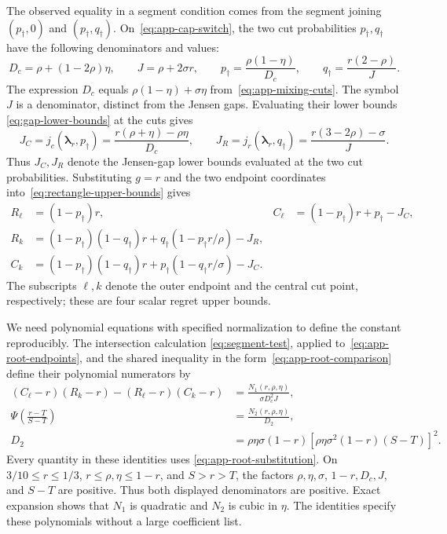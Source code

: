 \documentclass[11pt]{article}
\theoremstyle{remark}
\theoremstyle{plain}
\begin{document}
The observed equality in a segment condition comes from the segment joining
$(p_\dagger,0)$ and $(p_\dagger,q_\dagger)$. On~\eqref{eq:app-cap-switch},
the two cut probabilities $p_\dagger,q_\dagger$ have the following
denominators and values:
\begin{equation}
 D_c=\rho+(1-2\rho)\eta,\qquad J=\rho+2\sigma r,\qquad
 p_\dagger=\frac{\rho(1-\eta)}{D_c},\qquad
 q_\dagger=\frac{r(2-\rho)}{J}.
 \label{eq:app-root-cuts}
\end{equation}
The expression $D_c$ equals $\rho(1-\eta)+\sigma\eta$
from~\eqref{eq:app-mixing-cuts}. The symbol $J$ is a denominator,
distinct from the Jensen gaps. Evaluating their lower bounds
\eqref{eq:gap-lower-bounds} at the cuts gives
\begin{equation}
 J_C=j_c(\boldsymbol\lambda_r,p_\dagger)=\frac{r(\rho+\eta)-\rho\eta}{D_c},\qquad
 J_R=j_r(\boldsymbol\lambda_r,q_\dagger)=\frac{r(3-2\rho)-\sigma}{J}.
 \label{eq:app-root-gap-values}
\end{equation}
Thus $J_C,J_R$ denote the Jensen-gap lower bounds evaluated at the two
cut probabilities. Substituting $g=r$ and the two
endpoint coordinates into~\eqref{eq:rectangle-upper-bounds} gives
\begin{equation}
 \begin{aligned}
 R_\ell&=(1-p_\dagger)r,&
 C_\ell&=(1-p_\dagger)r+p_\dagger-J_C,\\
 R_k&=(1-p_\dagger)(1-q_\dagger)r
                    +q_\dagger(1-p_\dagger r/\rho)-J_R,\\
 C_k&=(1-p_\dagger)(1-q_\dagger)r
                    +p_\dagger(1-q_\dagger r/\sigma)-J_C.
 \end{aligned}
 \label{eq:app-root-endpoints}
\end{equation}
The subscripts $\ell,k$ denote the outer endpoint and the central
cut point, respectively; these are four scalar regret upper bounds.

We need polynomial equations with specified normalization to define
the constant reproducibly. The intersection calculation
\eqref{eq:segment-test}, applied to~\eqref{eq:app-root-endpoints},
and the shared inequality in the form~\eqref{eq:app-root-comparison} define their
polynomial numerators by
\begin{equation}
 \begin{aligned}
 (C_\ell-r)(R_k-r)-(R_\ell-r)(C_k-r)
       &=\frac{N_1(r,\rho,\eta)}{\sigma D_c^2J},\\
 \Psi\!\left(\frac{r-T}{S-T}\right)
       &=\frac{N_2(r,\rho,\eta)}{D_2},\\
 D_2&=\rho\eta\sigma(1-r)
            [\rho\eta\sigma^2(1-r)(S-T)]^2.
 \end{aligned}
 \label{eq:root-polys}
\end{equation}
Every quantity in these identities uses
\eqref{eq:app-root-substitution}. On $3/10\le r\le1/3$,
$r\le\rho,\eta\le1-r$, and $S>r>T$, the factors $\rho,\eta,\sigma$,
$1-r,D_c,J$, and $S-T$ are positive. Thus both displayed
denominators are positive. Exact expansion shows that $N_1$ is
quadratic and $N_2$ is cubic in $\eta$. The identities specify these
polynomials without a large coefficient list.
\end{document}
